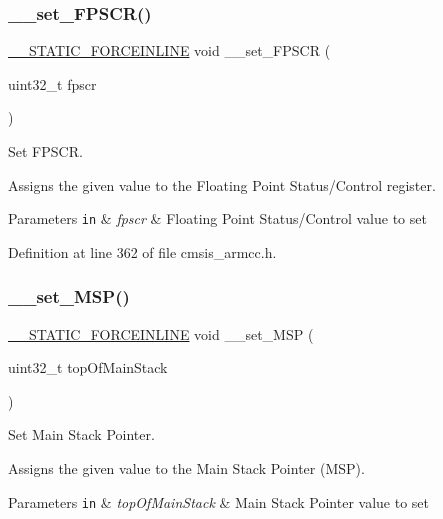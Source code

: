\subsubsection{\texorpdfstring{\+\_\+\+\_\+set\+\_\+\+F\+P\+S\+C\+R()}{\_\_set\_FPSCR()}}
{\footnotesize\ttfamily \hyperlink{cmsis__iccarm_8h_ab904513442afdf77d4f8c74f23cbb040}{\+\_\+\+\_\+\+S\+T\+A\+T\+I\+C\+\_\+\+F\+O\+R\+C\+E\+I\+N\+L\+I\+NE} void \+\_\+\+\_\+set\+\_\+\+F\+P\+S\+CR (\begin{DoxyParamCaption}\item[{uint32\+\_\+t}]{fpscr }\end{DoxyParamCaption})}



Set F\+P\+S\+CR. 

Assigns the given value to the Floating Point Status/\+Control register. 
\begin{DoxyParams}[1]{Parameters}
\mbox{\tt in}  & {\em fpscr} & Floating Point Status/\+Control value to set \\
\hline
\end{DoxyParams}


Definition at line 362 of file cmsis\+\_\+armcc.\+h.

\mbox{\label{group___c_m_s_i_s___core___reg_acc_functions_ga08b66e2b60a46fada36d90d2bc1e7c9b}} 
\subsubsection{\texorpdfstring{\+\_\+\+\_\+set\+\_\+\+M\+S\+P()}{\_\_set\_MSP()}}
{\footnotesize\ttfamily \hyperlink{cmsis__iccarm_8h_ab904513442afdf77d4f8c74f23cbb040}{\+\_\+\+\_\+\+S\+T\+A\+T\+I\+C\+\_\+\+F\+O\+R\+C\+E\+I\+N\+L\+I\+NE} void \+\_\+\+\_\+set\+\_\+\+M\+SP (\begin{DoxyParamCaption}\item[{uint32\+\_\+t}]{top\+Of\+Main\+Stack }\end{DoxyParamCaption})}



Set Main Stack Pointer. 

Assigns the given value to the Main Stack Pointer (M\+SP). 
\begin{DoxyParams}[1]{Parameters}
\mbox{\tt in}  & {\em top\+Of\+Main\+Stack} & Main Stack Pointer value to set \\
\hline
\end{DoxyParams}


